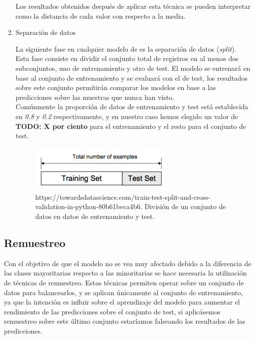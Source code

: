 \begin{enumerate}
                    Los resultados obtenidos después de aplicar esta técnica se pueden interpretar como la distancia de cada valor con respecto a la media.

                \item Separación de datos

                    La siguiente fase en cualquier modelo de  es la separación de datos (\textit{split}). Esta fase consiste en dividir el conjunto total de registros en al menos dos subconjuntos, uno de entrenamiento y otro de test. El modelo se entrenará en base al conjunto de entrenamiento y se evaluará con el de test, los resultados sobre este conjunto permitirán comparar los modelos en base a las predicciones sobre las muestras que nunca han visto.\\


                    Comúnmente la proporción de datos de entrenamiento y test está establecida en \textit{0.8} y \textit{0.2} respectivamente, y  en nuestro caso hemos elegido un valor de \textbf{TODO: X por ciento} para el entrenamiento y el resto para el conjunto de test.


                    \begin{figure}[h]
                        \centering
                        \includegraphics[width=7cm]{archivos/4.Metodologia/Datos/Separacion/DataSplit}
                        \caption{https://towardsdatascience.com/train-test-split-and-cross-validation-in-python-80b61beca4b6. División de un conjunto de datos en datos de entrenamiento y test.}
                        \label{DataSplitImage}
                     \end{figure}

            \end{enumerate}



        \subsection{Remuestreo}


            Con el objetivo de que el modelo no se vea muy afectado debido a la diferencia de las clases mayoritarias respecto a las minoritarias se hace necesaria la utilización de técnicas de remuestreo. Estas técnicas permiten operar sobre un conjunto de datos para balancearlos, y se aplican únicamente al conjunto de entrenamiento, ya que la intención  es influir sobre el aprendizaje del modelo para aumentar el rendimiento de las predicciones sobre el conjunto de test, si aplicásemos remuestreo sobre este último conjunto estaríamos falseando los resultados de las predicciones.


